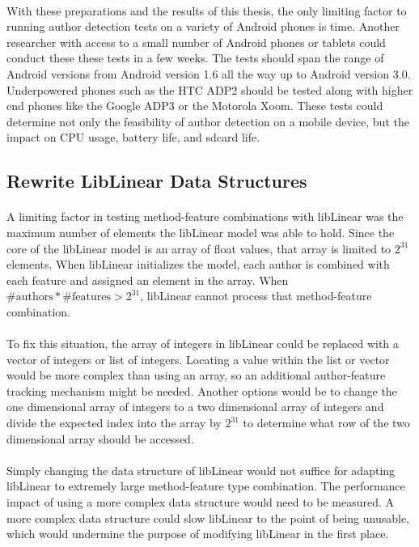 	\paragraph*{} With these preparations and the results of this thesis, the only limiting factor to running author detection tests on a variety of Android phones is time.  Another researcher with access to a small number of Android phones or tablets could conduct these these tests in a few weeks.  The tests should span the range of Android versions from Android version 1.6 all the way up to Android version 3.0.  Underpowered phones such as the HTC ADP2 should be tested along with higher end phones like the Google ADP3 or the Motorola Xoom.  These tests could determine not only the feasibility of author detection on a mobile device, but the impact on CPU usage, battery life, and sdcard life.

\subsection{Rewrite LibLinear Data Structures}
	\paragraph*{} A limiting factor in testing method-feature combinations with libLinear was the maximum number of elements the libLinear model was able to hold.  Since the core of the libLinear model is an array of float values, that array is limited to $2^{31}$ elements.  When libLinear initializes the model, each author is combined with each feature and assigned an element in the array.  When $ \text{\# authors} * \text{\# features} > 2^{31}$, libLinear cannot process that method-feature combination.
	\paragraph*{} To fix this situation, the array of integers in libLinear could be replaced with a vector of integers or list of integers.  Locating a value within the list or vector would be more complex than using an array, so an additional author-feature tracking mechanism might be needed.  Another options would be to change the one dimensional array of integers to a two dimensional array of integers and divide the expected index into the array by $2^{31}$ to determine what row of the two dimensional array should be accessed.
	\paragraph*{} Simply changing the data structure of libLinear would not suffice for adapting libLinear to extremely large method-feature type combination.  The performance impact of using a more complex data structure would need to be measured.  A more complex data structure could slow libLinear to the point of being unusable, which would undermine the purpose of modifying libLinear in the first place.


